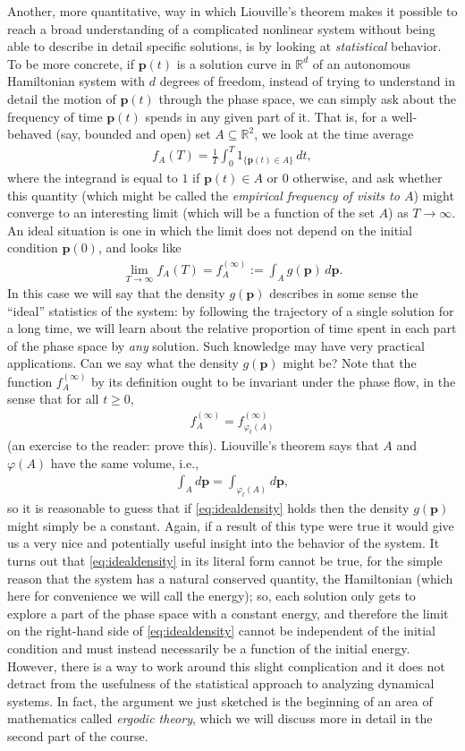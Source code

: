 \documentclass[12pt]{amsart}
\newcommand{\eq}[1]{\begin{equation}\begin{split}#1\end{split}\end{equation}}
\newcommand{\eqst}[1]{\begin{align*}#1\end{align*}}
\newcounter{exercise}
\begin{document}
Another, more quantitative, way in which Liouville's theorem makes it possible to reach a broad understanding of a complicated nonlinear system without being able to describe in detail specific solutions, is by looking at \emph{statistical} behavior. To be more concrete, if $\mathbf{p}(t)$ is a solution curve in $\mathbb{R}^d$ of an autonomous Hamiltonian system with $d$ degrees of freedom, instead of trying to understand in detail the motion of $\mathbf{p}(t)$ through the phase space, we can simply ask about the frequency of time $\mathbf{p}(t)$ spends in any given part of it. That is, for a well-behaved (say, bounded and open) set $A \subseteq \mathbb{R}^2$, we look at the time average
\eqst{
f_A(T) = \frac{1}{T} \int_0^T 1_{\{ \mathbf{p}(t) \in A\}}\,dt,
}
where the integrand is equal to $1$ if $\mathbf{p}(t)\in A$ or $0$ otherwise, and ask whether this quantity
(which might be called the \emph{empirical frequency of visits to $A$}) might converge to an interesting limit (which will be a function of the set $A$) as $T\to\infty$. An ideal situation is one in which the limit does not depend on the initial condition $\mathbf{p}(0)$, and looks like
\eq{ \label{eq:idealdensity}
\lim_{T\to\infty} f_A(T) = f_A^{(\infty)} := \int_A g(\mathbf{p})\,d\mathbf{p}.
}
In this case we will say that the density $g(\mathbf{p})$ describes in some sense the ``ideal'' statistics of the system: by following the trajectory of a single solution for a long time, we will learn about the relative proportion of time spent in each part of the phase space by \emph{any} solution. Such knowledge may have very practical applications. Can we say what the density $g(\mathbf{p})$ might be? Note that the function $f_A^{(\infty)}$ by its definition ought to be invariant under the phase flow, in the sense that for all $t\ge 0$,
\eqst{
f_A^{(\infty)} = f_{\varphi_t(A)}^{(\infty)}
}
(an exercise to the reader: prove this). Liouville's theorem says that $A$ and $\varphi(A)$ have the same volume, i.e.,
\eqst{
\int_A d\mathbf{p} = \int_{\varphi_t(A)} d\mathbf{p},
}
so it is reasonable to guess that if \eqref{eq:idealdensity} holds then the density $g(\mathbf{p})$ might simply be a constant. Again, if a result of this type were true it would give us a very nice and potentially useful insight into the behavior of the system. It turns out that \eqref{eq:idealdensity} in its literal form cannot be true, for the simple reason that the system has a natural conserved quantity, the Hamiltonian (which here for convenience we will call the energy); so, each solution only gets to explore a part of the phase space with a constant energy, and therefore the limit on the right-hand side of \eqref{eq:idealdensity} cannot be independent of the initial condition and must instead necessarily be a function of the initial energy. However, there is a way to work around this slight complication and it does not detract from the usefulness of the statistical approach to analyzing dynamical systems. In fact, the argument we just sketched is the beginning of an area of mathematics called \emph{ergodic theory}, which we will discuss more in detail in the second part of the course.
\end{document}

